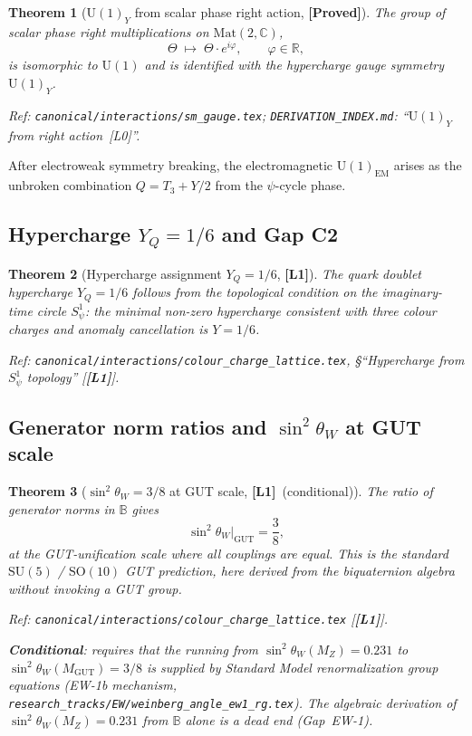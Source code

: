 \documentclass[12pt,a4paper]{article}
\newtheorem{theorem}{Theorem}[section]
\theoremstyle{definition}
\theoremstyle{remark}
\newcommand{\PROVED}{\textbf{[Proved]}}
\newcommand{\UU}[1]{\mathrm{U}(#1)}
\newcommand{\Lone}{\textbf{[L1]}}
\begin{document}
\begin{theorem}[$\UU{1}_Y$ from scalar phase right action, \PROVED]
\label{thm:u1}
The group of scalar phase right multiplications on $\mathrm{Mat}(2,\mathbb{C})$,
\[
  \Theta \;\mapsto\; \Theta\cdot e^{i\varphi}, \qquad \varphi\in\mathbb{R},
\]
is isomorphic to $\UU{1}$ and is identified with the hypercharge gauge
symmetry $\UU{1}_Y$.

Ref: \texttt{canonical/interactions/sm\_gauge.tex};
\texttt{DERIVATION\_INDEX.md}: ``$\UU{1}_Y$ from right action~[L0]''.
\end{theorem}

After electroweak symmetry breaking, the electromagnetic $\UU{1}_{\mathrm{EM}}$
arises as the unbroken combination $Q = T_3 + Y/2$ from the $\psi$-cycle phase.

\subsection{Hypercharge $Y_Q = 1/6$ and Gap C2}

\begin{theorem}[Hypercharge assignment $Y_Q = 1/6$, \Lone]
\label{thm:hypercharge}
The quark doublet hypercharge $Y_Q = 1/6$ follows from the
topological condition on the imaginary-time circle $S^1_\psi$:
the minimal non-zero hypercharge consistent with three colour charges
and anomaly cancellation is $Y = 1/6$.

Ref: \texttt{canonical/interactions/colour\_charge\_lattice.tex},
\S ``Hypercharge from $S^1_\psi$ topology'' [\Lone].
\end{theorem}

\subsection{Generator norm ratios and $\sin^2\theta_W$ at GUT scale}

\begin{theorem}[$\sin^2\theta_W = 3/8$ at GUT scale, \Lone\ (conditional)]
\label{thm:weinberg_gut}
The ratio of generator norms in $\mathbb{B}$ gives
\[
\sin^2\theta_W\big|_{\mathrm{GUT}} = \frac{3}{8},
\]
at the GUT-unification scale where all couplings are equal.
This is the standard $\mathrm{SU}(5)$ / $\mathrm{SO}(10)$ GUT prediction,
here derived from the biquaternion algebra without invoking a GUT group.

Ref: \texttt{canonical/interactions/colour\_charge\_lattice.tex} [\Lone].

\textbf{Conditional}: requires that the running from $\sin^2\theta_W(M_Z) = 0.231$
to $\sin^2\theta_W(M_{\mathrm{GUT}}) = 3/8$ is supplied by Standard Model
renormalization group equations (EW-1b mechanism,
\texttt{research\_tracks/EW/weinberg\_angle\_ew1\_rg.tex}).
The algebraic derivation of $\sin^2\theta_W(M_Z) = 0.231$ from $\mathbb{B}$
alone is a dead end (Gap~EW-1).
\end{theorem}
\end{document}
